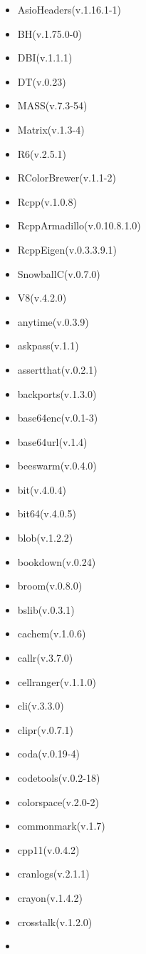 \documentclass[
]{article}
\providecommand{\tightlist}{%
  \setlength{\itemsep}{0pt}\setlength{\parskip}{0pt}}
\begin{document}
\begin{itemize}
\tightlist
\item
  AsioHeaders(v.1.16.1-1)
\item
  BH(v.1.75.0-0)
\item
  DBI(v.1.1.1)
\item
  DT(v.0.23)
\item
  MASS(v.7.3-54)
\item
  Matrix(v.1.3-4)
\item
  R6(v.2.5.1)
\item
  RColorBrewer(v.1.1-2)
\item
  Rcpp(v.1.0.8)
\item
  RcppArmadillo(v.0.10.8.1.0)
\item
  RcppEigen(v.0.3.3.9.1)
\item
  SnowballC(v.0.7.0)
\item
  V8(v.4.2.0)
\item
  anytime(v.0.3.9)
\item
  askpass(v.1.1)
\item
  assertthat(v.0.2.1)
\item
  backports(v.1.3.0)
\item
  base64enc(v.0.1-3)
\item
  base64url(v.1.4)
\item
  beeswarm(v.0.4.0)
\item
  bit(v.4.0.4)
\item
  bit64(v.4.0.5)
\item
  blob(v.1.2.2)
\item
  bookdown(v.0.24)
\item
  broom(v.0.8.0)
\item
  bslib(v.0.3.1)
\item
  cachem(v.1.0.6)
\item
  callr(v.3.7.0)
\item
  cellranger(v.1.1.0)
\item
  cli(v.3.3.0)
\item
  clipr(v.0.7.1)
\item
  coda(v.0.19-4)
\item
  codetools(v.0.2-18)
\item
  colorspace(v.2.0-2)
\item
  commonmark(v.1.7)
\item
  cpp11(v.0.4.2)
\item
  cranlogs(v.2.1.1)
\item
  crayon(v.1.4.2)
\item
  crosstalk(v.1.2.0)
\item

\end{itemize}
\end{document}
